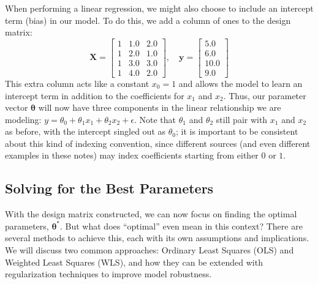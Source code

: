\begin{exampleBox}
When performing a linear regression, we might also choose to include an intercept term (bias) in our model. To do this, we add a column of ones to the design matrix:
\begin{equation}
    \mathbf{X} =
    \begin{bmatrix}
        1 & 1.0 & 2.0 \\
        1 & 2.0 & 1.0 \\
        1 & 3.0 & 3.0 \\
        1 & 4.0 & 2.0
    \end{bmatrix}, \quad
    \mathbf{y} =
    \begin{bmatrix}
        5.0 \\
        6.0 \\
        10.0 \\
        9.0
    \end{bmatrix}
\end{equation}
This extra column acts like a constant $x_0 = 1$ and allows the model to learn an intercept term in addition to the coefficients for $x_1$ and $x_2$. Thus, our parameter vector $\boldsymbol{\theta}$ will now have three components in the linear relationship we are modeling: $y = \theta_0 + \theta_1 x_1 + \theta_2 x_2 + \epsilon$. Note that $\theta_1$ and $\theta_2$ still pair with $x_1$ and $x_2$ as before, with the intercept singled out as $\theta_0$; it is important to be consistent about this kind of indexing convention, since different sources (and even different examples in these notes) may index coefficients starting from either $0$ or $1$.
\end{exampleBox}

\subsection{Solving for the Best Parameters}
With the design matrix constructed, we can now focus on finding the optimal parameters, $\boldsymbol{\theta}^*$. But what does ``optimal'' even mean in this context? There are several methods to achieve this, each with its own assumptions and implications. We will discuss two common approaches: Ordinary Least Squares (OLS) and Weighted Least Squares (WLS), and how they can be extended with regularization techniques to improve model robustness.

